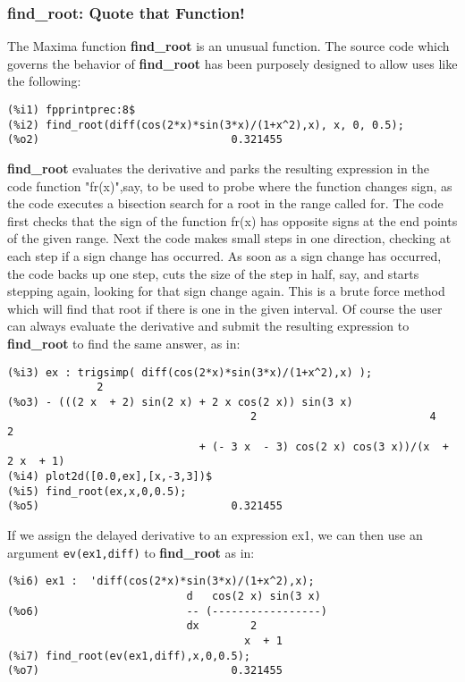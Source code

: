 \documentclass[12pt]{article}
\begin{document}
\subsubsection{find\_root: Quote that Function!}
The Maxima function \textbf{find\_root} is an unusual function.
The source code which governs the behavior of \textbf{find\_root} has been
  purposely designed to allow uses like the following:
\small
\begin{verbatim}
(%i1) fpprintprec:8$
(%i2) find_root(diff(cos(2*x)*sin(3*x)/(1+x^2),x), x, 0, 0.5);
(%o2)                              0.321455
\end{verbatim}
\normalsize
\textbf{find\_root} evaluates the derivative and parks the resulting expression in
  the code function "fr(x)",say, to be used to probe where the function changes sign, as the code
   executes a bisection search for a root in the range called for.
The code first checks that the sign of the function fr(x) has opposite signs at the end points
  of the given range.
Next the code makes small steps in one direction, checking at each step if a sign change has
  occurred.
As soon as a sign change has occurred, the code backs up one step, cuts the size of the step in
  half, say, and starts stepping again, looking for that sign change again.
This is a brute force method which will find that root if there is one in the given
  interval.
Of course the user can always evaluate the derivative and submit the resulting expression
  to \textbf{find\_root} to find the same answer, as in:
\small
\begin{verbatim}
(%i3) ex : trigsimp( diff(cos(2*x)*sin(3*x)/(1+x^2),x) );
              2
(%o3) - (((2 x  + 2) sin(2 x) + 2 x cos(2 x)) sin(3 x)
                                      2                           4      2
                              + (- 3 x  - 3) cos(2 x) cos(3 x))/(x  + 2 x  + 1)
(%i4) plot2d([0.0,ex],[x,-3,3])$
(%i5) find_root(ex,x,0,0.5);
(%o5)                              0.321455
\end{verbatim}
\normalsize
\newpage
If we assign the delayed derivative to an expression ex1, we can then
  use an argument \verb|ev(ex1,diff)| to \textbf{find\_root} as in:
\small
\begin{verbatim}
(%i6) ex1 :  'diff(cos(2*x)*sin(3*x)/(1+x^2),x);
                            d   cos(2 x) sin(3 x)
(%o6)                       -- (-----------------)
                            dx        2
                                     x  + 1
(%i7) find_root(ev(ex1,diff),x,0,0.5);
(%o7)                              0.321455
\end{verbatim}
\end{document}
